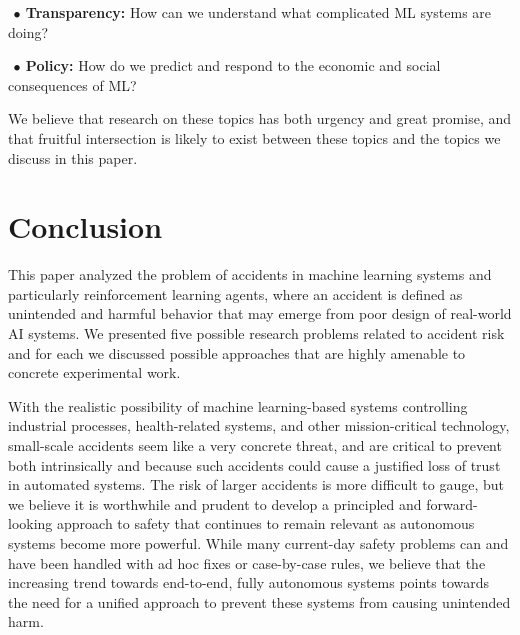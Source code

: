 \documentclass[a4paper,10pt]{article}
\begin{document}
\begin{itemize}
{$~\bullet~${\bf Transparency:} How can we understand what complicated ML systems are doing?  \cite{olah2015visualizing,yosinski2015understanding,mordvintsev2015inceptionism,nguyen2016synthesizing}

$~\bullet~${\bf Policy:} How do we predict and respond to the economic and social consequences of ML? \cite{brynjolfsson2014second,frey2013future,arntz2016risk,calo2011open}
}

We believe that research on these topics has both urgency and great promise, and that fruitful intersection is likely to exist between these topics and the topics we discuss in this paper.
\end{itemize}
\section{Conclusion}\label{conclusion}
This paper analyzed the problem of accidents in machine learning systems and particularly reinforcement learning agents, where an accident is defined as unintended and harmful behavior that may emerge from poor design of real-world AI systems.  We presented five possible research problems related to accident risk and for each we discussed possible approaches that are highly amenable to concrete experimental work.

With the realistic possibility of machine learning-based systems controlling industrial processes, health-related systems, and other mission-critical technology, small-scale accidents seem like a very concrete threat, and are critical to prevent both intrinsically and because such accidents could cause a justified loss of trust in automated systems.  The risk of larger accidents is more difficult to gauge, but we believe it is worthwhile and prudent to develop a principled and forward-looking approach to safety that continues to remain relevant as autonomous systems become more powerful.  While many current-day safety problems can and have been handled with ad hoc fixes or case-by-case rules, we believe that the increasing trend towards end-to-end, fully autonomous systems points towards the need for a unified approach to prevent these systems from causing unintended harm.
\end{document}
